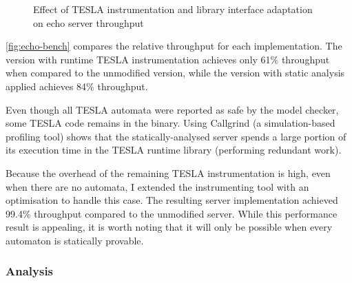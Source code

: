 \begin{figure}
  \centering
  \caption{Effect of TESLA instrumentation and library interface adaptation on
  echo server throughput}
  \label{fig:echo-bench}
\end{figure}

\autoref{fig:echo-bench} compares the relative throughput for each
implementation. The version with runtime TESLA instrumentation achieves only 61\%
throughput when compared to the unmodified version, while the version with
static analysis applied achieves 84\% throughput.

Even though all TESLA automata were reported as safe by the model checker, some
TESLA code remains in the binary. Using Callgrind \cite{weidendorfer_tool_2004}
(a simulation-based profiling tool) shows that the statically-analysed server
spends a large portion of its execution time in the TESLA runtime library
(performing redundant work).

Because the overhead of the remaining TESLA instrumentation is high, even when
there are no automata, I extended the instrumenting tool with an optimisation to
handle this case. The resulting server implementation achieved 99.4\% throughput
compared to the unmodified server. While this performance result is appealing,
it is worth noting that it will only be possible when every automaton is
statically provable.

\subsubsection{Analysis} \label{sec:perf-analysis}

